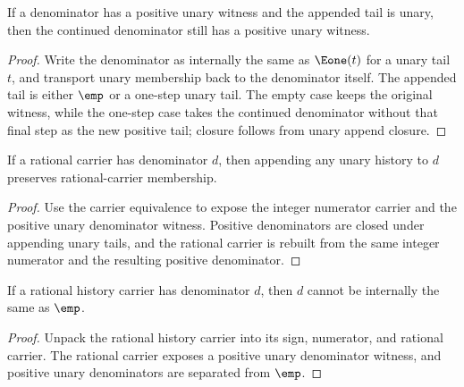\begin{theorem}
\label{thm:rat-positive-denominator-append-unary-tail}
If a denominator has a positive unary witness and the appended tail is unary, then the continued denominator still has a positive unary witness.
\end{theorem}
\begin{proof}
Write the denominator as internally the same as \(\Eone(t)\) for a unary tail \(t\), and transport unary membership back to the denominator itself. The appended tail is either \(\emp\) or a one-step unary tail. The empty case keeps the original witness, while the one-step case takes the continued denominator without that final step as the new positive tail; closure follows from unary append closure.
\end{proof}

\begin{theorem}
\label{thm:rat-carrier-append-unary-denominator-closed}
If a rational carrier has denominator \(d\), then appending any unary history to
\(d\) preserves rational-carrier membership.
\end{theorem}
\begin{proof}
Use the carrier equivalence to expose the integer numerator carrier and the
positive unary denominator witness. Positive denominators are closed under
appending unary tails, and the rational carrier is rebuilt from the same
integer numerator and the resulting positive denominator.
\end{proof}

\begin{theorem}
\label{thm:rat-history-carrier-not-empty}
If a rational history carrier has denominator \(d\), then \(d\) cannot be
internally the same as \(\emp\).
\end{theorem}
\begin{proof}
Unpack the rational history carrier into its sign, numerator, and rational
carrier. The rational carrier exposes a positive unary denominator witness, and
positive unary denominators are separated from \(\emp\).
\end{proof}

